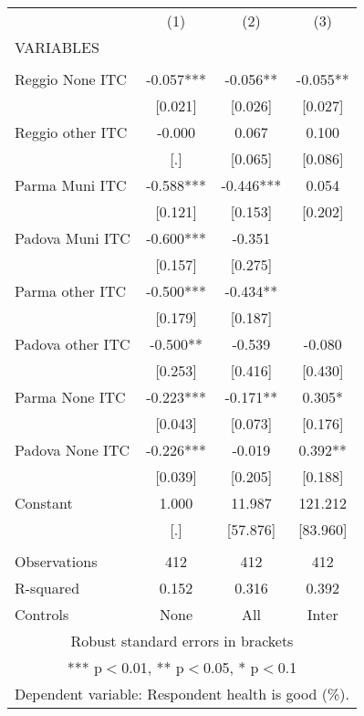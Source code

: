 \begin{tabular}{lccc} \hline
 & (1) & (2) & (3) \\
VARIABLES &  &  &  \\ \hline
 &  &  &  \\
Reggio None ITC & -0.057*** & -0.056** & -0.055** \\
 & [0.021] & [0.026] & [0.027] \\
Reggio other ITC & -0.000 & 0.067 & 0.100 \\
 & [.] & [0.065] & [0.086] \\
Parma Muni ITC & -0.588*** & -0.446*** & 0.054 \\
 & [0.121] & [0.153] & [0.202] \\
Padova Muni ITC & -0.600*** & -0.351 &  \\
 & [0.157] & [0.275] &  \\
Parma other ITC & -0.500*** & -0.434** &  \\
 & [0.179] & [0.187] &  \\
Padova other ITC & -0.500** & -0.539 & -0.080 \\
 & [0.253] & [0.416] & [0.430] \\
Parma None ITC & -0.223*** & -0.171** & 0.305* \\
 & [0.043] & [0.073] & [0.176] \\
Padova None ITC & -0.226*** & -0.019 & 0.392** \\
 & [0.039] & [0.205] & [0.188] \\
Constant & 1.000 & 11.987 & 121.212 \\
 & [.] & [57.876] & [83.960] \\
 &  &  &  \\
Observations & 412 & 412 & 412 \\
R-squared & 0.152 & 0.316 & 0.392 \\
 Controls & None & All & Inter \\ \hline
\multicolumn{4}{c}{ Robust standard errors in brackets} \\
\multicolumn{4}{c}{ *** p$<$0.01, ** p$<$0.05, * p$<$0.1} \\
\multicolumn{4}{c}{ Dependent variable: Respondent health is good (\%).} \\
\end{tabular}
